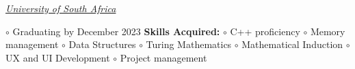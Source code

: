 \documentclass[10pt,a4paper,ragged2e,withhyper]{altacv}
\newcommand{\myhref}[2]{
		\href{#1}
		{\textcolor{ColorTwo}{#2}}
	}
\begin{document}
\begin{adjustbox}{valign=t}
\begin{minipage}{0.6\textwidth}
                    	\textit{\myhref{https://www.unisa.ac.za//}{University of South Africa}}\hfill \break 
                    	\begin{description}
                          \vspace{-5mm} \textcolor{ColorOne}{$\circ$} Graduating by December 2023\hfill \break
                           \textbf{Skills Acquired:}\hfill \break
                           \textcolor{ColorOne}{$\circ$} C++ proficiency\hfill \break
                           \textcolor{ColorOne}{$\circ$} Memory management\hfill \break
                           \textcolor{ColorOne}{$\circ$} Data Structures\hfill \break
                           \textcolor{ColorOne}{$\circ$} Turing Mathematics\hfill \break
                           \textcolor{ColorOne}{$\circ$} Mathematical Induction\hfill \break
                           \textcolor{ColorOne}{$\circ$} UX and UI Development\hfill \break 
                           \textcolor{ColorOne}{$\circ$} Project management\hfill \break
                        \end{description}

              
            \vfill
        \end{minipage}
    \end{adjustbox}  
    
\end{document}
